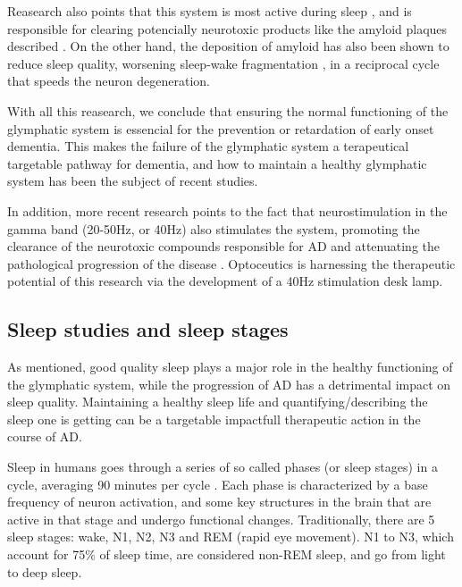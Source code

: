 Reasearch also points that this system is most active during sleep \cite{jessen2015glymphaticGuide}, and is responsible for clearing potencially neurotoxic products like the amyloid plaques described \cite{nedergaard2020glymphaticFailure, 2018glymphaticDementia}. On the other hand, the deposition of amyloid has also been shown to reduce sleep quality, worsening sleep-wake fragmentation \cite{2014sleepAD}, in a reciprocal cycle that speeds the neuron degeneration. 


With all this reasearch, we conclude that ensuring the normal functioning of the glymphatic system is essencial for the prevention or retardation of early onset dementia. This makes the failure of the glymphatic system a terapeutical targetable pathway for dementia, and how to maintain a healthy glymphatic system has been the subject of recent studies.


In addition, more recent research points to the fact that neurostimulation in the gamma band (20-50Hz, or 40Hz) also stimulates the system, promoting the clearance of the neurotoxic compounds responsible for AD and attenuating the pathological progression of the disease \cite{2024gammaClearance, 2016gammaAttenuates}.
Optoceutics is harnessing the therapeutic potential of this research via the development of a 40Hz stimulation desk lamp.




\subsection{Sleep studies and sleep stages}
As mentioned, good quality sleep plays a major role in the healthy functioning of the glymphatic system, while the progression of AD has a detrimental impact on sleep quality. Maintaining a healthy sleep life and quantifying/describing the sleep one is getting can be a targetable impactfull therapeutic action in the course of AD.

Sleep in humans goes through a series of so called phases (or sleep stages) in a cycle, averaging 90 minutes per cycle  
\cite{2014sleepAD, 2012AASMManualForSleepScoring}. 
Each phase is characterized by a base frequency of neuron activation, and some key structures in the brain that are active in that stage and undergo functional changes. 
Traditionally, there are 5 sleep stages: wake, N1, N2, N3 and REM (rapid eye movement). N1 to N3, which account for 75\% of sleep time, are considered non-REM sleep, and go from light to deep sleep. 



